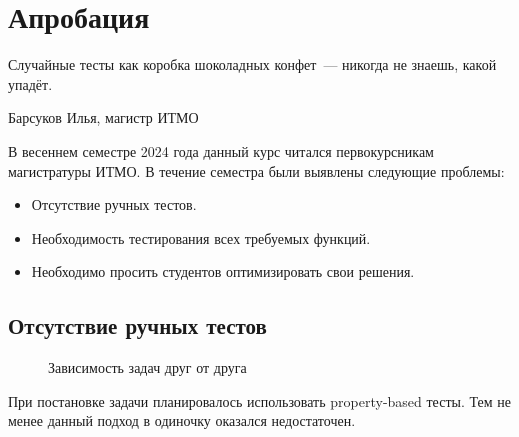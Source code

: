 
\section{Апробация}

\epigraph{Случайные тесты как коробка шоколадных конфет~--- никогда не знаешь, какой упадёт.}{Барсуков Илья, магистр ИТМО}

В весеннем семестре 2024 года данный курс читался первокурсникам магистратуры ИТМО.
В течение семестра были выявлены следующие проблемы:
\begin{itemize}
    \item Отсутствие ручных тестов.
    \item Необходимость тестирования всех требуемых функций.
    \item Необходимо просить студентов оптимизировать свои решения.
\end{itemize}

\subsection{Отсутствие ручных тестов}

\begin{figure}[b]
    \caption{Зависимость задач друг от друга}
    \label{fig:dependencies}
    \centering
\end{figure}

При постановке задачи планировалось использовать property-based тесты.
Тем не менее данный подход в одиночку оказался недостаточен.


